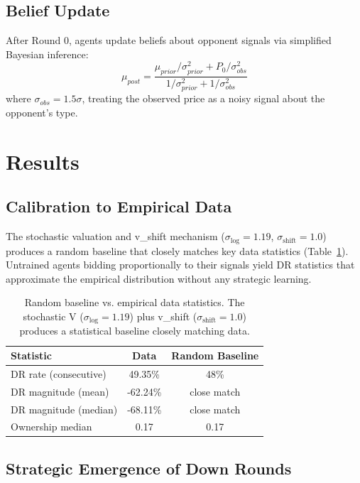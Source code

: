 \documentclass[11pt,a4paper]{article}
\begin{document}
\subsection{Belief Update}

After Round 0, agents update beliefs about opponent signals via simplified Bayesian inference:
\begin{equation}
\mu_{post} = \frac{\mu_{prior}/\sigma_{prior}^2 + P_0/\sigma_{obs}^2}{1/\sigma_{prior}^2 + 1/\sigma_{obs}^2}
\end{equation}
where $\sigma_{obs} = 1.5\sigma$, treating the observed price as a noisy signal about the opponent's type.

\section{Results}

\subsection{Calibration to Empirical Data}

The stochastic valuation and v\_shift mechanism ($\sigma_{\log}=1.19$, $\sigma_{\text{shift}}=1.0$) produces a random baseline that closely matches key data statistics (Table~\ref{tab:calibration}). Untrained agents bidding proportionally to their signals yield DR statistics that approximate the empirical distribution without any strategic learning.

\begin{table}[t]
\centering
\caption{Random baseline vs. empirical data statistics. The stochastic V ($\sigma_{\log}=1.19$) plus v\_shift ($\sigma_{\text{shift}}=1.0$) produces a statistical baseline closely matching data.}
\label{tab:calibration}
\begin{tabular}{lcc}
\toprule
\textbf{Statistic} & \textbf{Data} & \textbf{Random Baseline} \\
\midrule
DR rate (consecutive) & 49.35\% & 48\% \\
DR magnitude (mean) & -62.24\% & close match \\
DR magnitude (median) & -68.11\% & close match \\
Ownership median & 0.17 & 0.17 \\
\bottomrule
\end{tabular}
\end{table}

\subsection{Strategic Emergence of Down Rounds}
\end{document}
